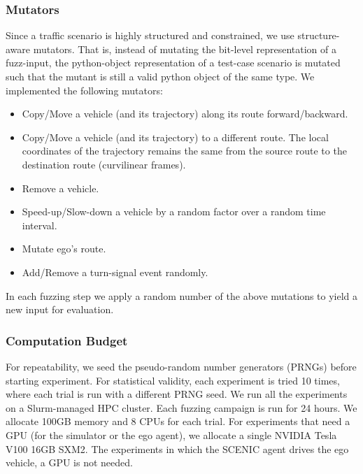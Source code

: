 \subsubsection{Mutators}
Since a traffic scenario is highly structured and constrained, we use structure-aware mutators.
%
That is, instead of mutating the bit-level representation of a fuzz-input,
the python-object representation of a test-case scenario is mutated such that
the mutant is still a valid python object of the same type.
%
We implemented the following mutators:
\begin{itemize}
    \item Copy/Move a vehicle (and its trajectory) along its route forward/backward.
    \item Copy/Move a vehicle (and its trajectory) to a different route. The local coordinates of the trajectory remains the same from the source route to the destination route (curvilinear frames).
    \item Remove a vehicle.
    \item Speed-up/Slow-down a vehicle by a random factor over a random time interval.
    \item Mutate ego’s route.
    \item Add/Remove a turn-signal event randomly.
\end{itemize}
%
In each fuzzing step we apply a random number of the above mutations to yield a new input for evaluation.


\subsubsection{Computation Budget}
For repeatability, we seed the pseudo-random number generators (PRNGs) before starting experiment.
%
For statistical validity, each experiment is tried 10 times, where each trial is run with a different PRNG seed.
%
We run all the experiments on a Slurm-managed HPC cluster.
%
Each fuzzing campaign is run for 24 hours.
%
We allocate 100GB memory and 8 CPUs for each trial.
%
For experiments that need a GPU (for the simulator or the ego agent),
we allocate a single NVIDIA Tesla V100 16GB SXM2.
%
The experiments in which the SCENIC agent drives the ego vehicle, a GPU is not needed.
